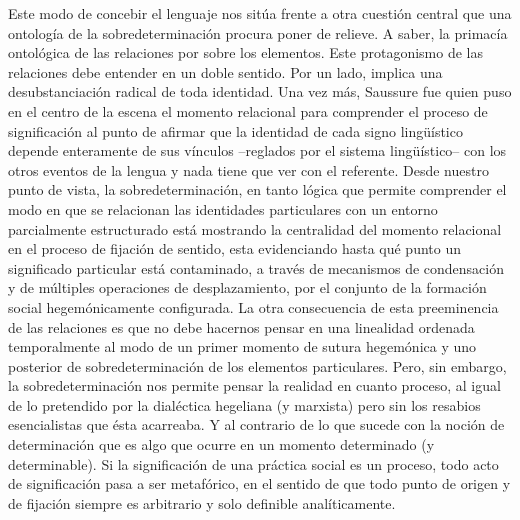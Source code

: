 \documentclass{book}
\begin{document}
Este modo de concebir el lenguaje nos sitúa frente a otra cuestión
central que una ontología de la sobredeterminación procura poner de
relieve. A saber, la primacía ontológica de las relaciones por sobre los
elementos. Este protagonismo de las relaciones debe entender en un doble
sentido. Por un lado, implica una desubstanciación radical de toda
identidad. Una vez más, Saussure fue quien puso en el centro de la
escena el momento relacional para comprender el proceso de significación
al punto de afirmar que la identidad de cada signo lingüístico depende
enteramente de sus vínculos --reglados por el sistema lingüístico-- con
los otros eventos de la lengua y nada tiene que ver con el referente.
Desde nuestro punto de vista, la sobredeterminación, en tanto lógica que
permite comprender el modo en que se relacionan las identidades
particulares con un entorno parcialmente estructurado está mostrando la
centralidad del momento relacional en el proceso de fijación de sentido,
esta evidenciando hasta qué punto un significado particular está
contaminado, a través de mecanismos de condensación y de múltiples
operaciones de desplazamiento, por el conjunto de la formación social
hegemónicamente configurada. La otra consecuencia de esta preeminencia
de las relaciones es que no debe hacernos pensar en una linealidad
ordenada temporalmente al modo de un primer momento de sutura hegemónica
y uno posterior de sobredeterminación de los elementos particulares.
Pero, sin embargo, la sobredeterminación nos permite pensar la realidad
en cuanto proceso, al igual de lo pretendido por la dialéctica hegeliana
(y marxista) pero sin los resabios esencialistas que ésta acarreaba. Y
al contrario de lo que sucede con la noción de determinación que es algo
que ocurre en un momento determinado (y determinable). Si la
significación de una práctica social es un proceso, todo acto de
significación pasa a ser metafórico, en el sentido de que todo punto de
origen y de fijación siempre es arbitrario y solo definible
analíticamente.
\end{document}
